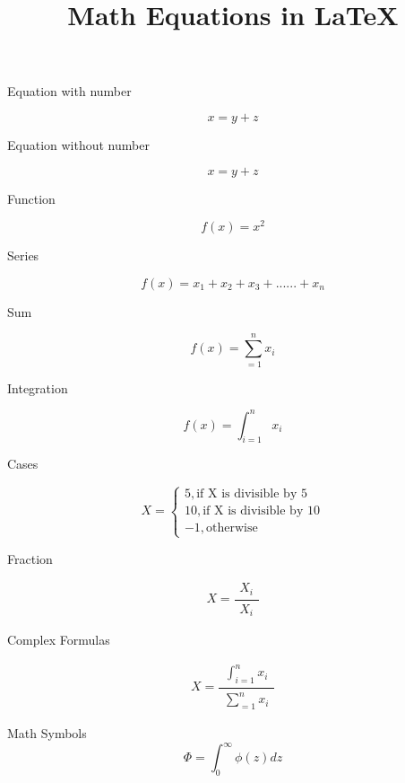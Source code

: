 \documentclass{article}
\begin{document}
\title{Math Equations in {\LaTeX}}
\maketitle

Equation with number

\begin{equation}
x = y + z
\end{equation}

Equation without number

\begin{equation*}
x = y + z
\end{equation*}

Function

\begin{equation}
f(x) = x ^ 2
\end{equation}

Series

\begin{equation}
f(x) = x_1 + x_2 + x_3 + ...... + x_n
\end{equation}

Sum

\begin{equation}
f(x) = \sum_{=1}^{n}{x_i}
\end{equation}

Integration

\begin{equation}
f(x) = \int_{i=1}^{n}{x_i}
\end{equation}

Cases

\begin{equation}
X=
\begin{cases}
5, \text{if X is divisible by 5}
\\
10, \text{if X is divisible by 10}
\\
-1, \text{otherwise}
\end{cases}
\end{equation}

Fraction

\begin{equation}
X =
\frac{\substack{X_i}}
{\substack{X_i}}
\end{equation}

Complex Formulas

\begin{equation}
X =
\frac{\substack{\int_{i=1}^{n}{x_i}}}
{\substack{\sum_{=1}^{n}{x_i}}}
\end{equation}

Math Symbols
\begin{equation}
\Phi=\int_0^\infty \phi(z) dz
\end{equation}
\end{document}
